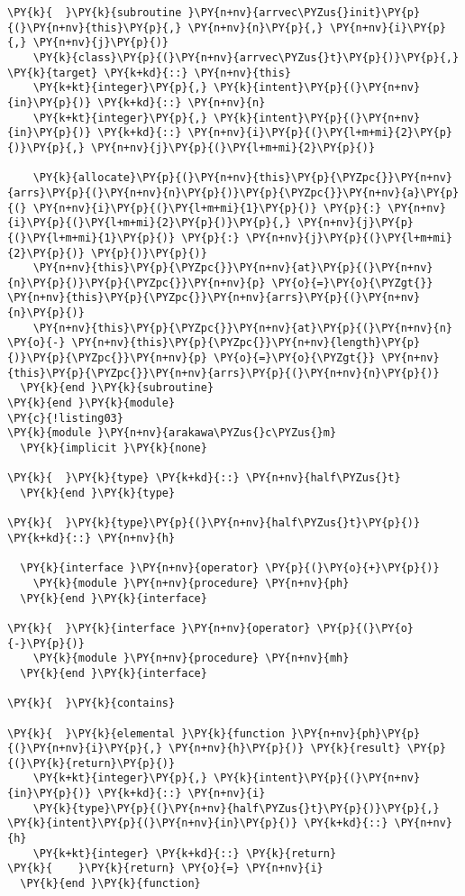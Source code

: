 \begin{Verbatim}[commandchars=\\\{\}]
\PY{k}{  }\PY{k}{subroutine }\PY{n+nv}{arrvec\PYZus{}init}\PY{p}{(}\PY{n+nv}{this}\PY{p}{,} \PY{n+nv}{n}\PY{p}{,} \PY{n+nv}{i}\PY{p}{,} \PY{n+nv}{j}\PY{p}{)}
    \PY{k}{class}\PY{p}{(}\PY{n+nv}{arrvec\PYZus{}t}\PY{p}{)}\PY{p}{,} \PY{k}{target} \PY{k+kd}{::} \PY{n+nv}{this}
    \PY{k+kt}{integer}\PY{p}{,} \PY{k}{intent}\PY{p}{(}\PY{n+nv}{in}\PY{p}{)} \PY{k+kd}{::} \PY{n+nv}{n}
    \PY{k+kt}{integer}\PY{p}{,} \PY{k}{intent}\PY{p}{(}\PY{n+nv}{in}\PY{p}{)} \PY{k+kd}{::} \PY{n+nv}{i}\PY{p}{(}\PY{l+m+mi}{2}\PY{p}{)}\PY{p}{,} \PY{n+nv}{j}\PY{p}{(}\PY{l+m+mi}{2}\PY{p}{)}

    \PY{k}{allocate}\PY{p}{(}\PY{n+nv}{this}\PY{p}{\PYZpc{}}\PY{n+nv}{arrs}\PY{p}{(}\PY{n+nv}{n}\PY{p}{)}\PY{p}{\PYZpc{}}\PY{n+nv}{a}\PY{p}{(} \PY{n+nv}{i}\PY{p}{(}\PY{l+m+mi}{1}\PY{p}{)} \PY{p}{:} \PY{n+nv}{i}\PY{p}{(}\PY{l+m+mi}{2}\PY{p}{)}\PY{p}{,} \PY{n+nv}{j}\PY{p}{(}\PY{l+m+mi}{1}\PY{p}{)} \PY{p}{:} \PY{n+nv}{j}\PY{p}{(}\PY{l+m+mi}{2}\PY{p}{)} \PY{p}{)}\PY{p}{)}
    \PY{n+nv}{this}\PY{p}{\PYZpc{}}\PY{n+nv}{at}\PY{p}{(}\PY{n+nv}{n}\PY{p}{)}\PY{p}{\PYZpc{}}\PY{n+nv}{p} \PY{o}{=}\PY{o}{\PYZgt{}} \PY{n+nv}{this}\PY{p}{\PYZpc{}}\PY{n+nv}{arrs}\PY{p}{(}\PY{n+nv}{n}\PY{p}{)}
    \PY{n+nv}{this}\PY{p}{\PYZpc{}}\PY{n+nv}{at}\PY{p}{(}\PY{n+nv}{n} \PY{o}{-} \PY{n+nv}{this}\PY{p}{\PYZpc{}}\PY{n+nv}{length}\PY{p}{)}\PY{p}{\PYZpc{}}\PY{n+nv}{p} \PY{o}{=}\PY{o}{\PYZgt{}} \PY{n+nv}{this}\PY{p}{\PYZpc{}}\PY{n+nv}{arrs}\PY{p}{(}\PY{n+nv}{n}\PY{p}{)}
  \PY{k}{end }\PY{k}{subroutine}
\PY{k}{end }\PY{k}{module}
\PY{c}{!listing03}
\PY{k}{module }\PY{n+nv}{arakawa\PYZus{}c\PYZus{}m}
  \PY{k}{implicit }\PY{k}{none}

\PY{k}{  }\PY{k}{type} \PY{k+kd}{::} \PY{n+nv}{half\PYZus{}t}
  \PY{k}{end }\PY{k}{type}

\PY{k}{  }\PY{k}{type}\PY{p}{(}\PY{n+nv}{half\PYZus{}t}\PY{p}{)} \PY{k+kd}{::} \PY{n+nv}{h}

  \PY{k}{interface }\PY{n+nv}{operator} \PY{p}{(}\PY{o}{+}\PY{p}{)}
    \PY{k}{module }\PY{n+nv}{procedure} \PY{n+nv}{ph}
  \PY{k}{end }\PY{k}{interface}

\PY{k}{  }\PY{k}{interface }\PY{n+nv}{operator} \PY{p}{(}\PY{o}{-}\PY{p}{)}
    \PY{k}{module }\PY{n+nv}{procedure} \PY{n+nv}{mh}
  \PY{k}{end }\PY{k}{interface}

\PY{k}{  }\PY{k}{contains}

\PY{k}{  }\PY{k}{elemental }\PY{k}{function }\PY{n+nv}{ph}\PY{p}{(}\PY{n+nv}{i}\PY{p}{,} \PY{n+nv}{h}\PY{p}{)} \PY{k}{result} \PY{p}{(}\PY{k}{return}\PY{p}{)}
    \PY{k+kt}{integer}\PY{p}{,} \PY{k}{intent}\PY{p}{(}\PY{n+nv}{in}\PY{p}{)} \PY{k+kd}{::} \PY{n+nv}{i}
    \PY{k}{type}\PY{p}{(}\PY{n+nv}{half\PYZus{}t}\PY{p}{)}\PY{p}{,} \PY{k}{intent}\PY{p}{(}\PY{n+nv}{in}\PY{p}{)} \PY{k+kd}{::} \PY{n+nv}{h}
    \PY{k+kt}{integer} \PY{k+kd}{::} \PY{k}{return}
\PY{k}{    }\PY{k}{return} \PY{o}{=} \PY{n+nv}{i} 
  \PY{k}{end }\PY{k}{function}


\end{Verbatim}
